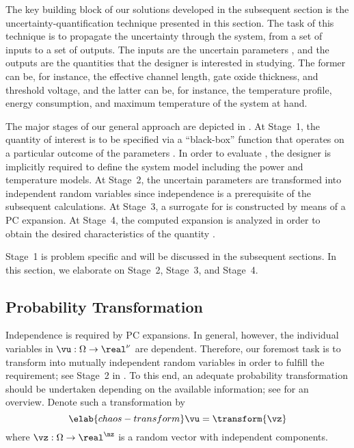 The key building block of our solutions developed in the subsequent section is
the uncertainty-quantification technique presented in this section. The task of
this technique is to propagate the uncertainty through the system, from a set of
inputs to a set of outputs. The inputs are the uncertain parameters \vu, and the
outputs are the quantities that the designer is interested in studying. The
former can be, for instance, the effective channel length, gate oxide thickness,
and threshold voltage, and the latter can be, for instance, the temperature
profile, energy consumption, and maximum temperature of the system at hand.

The major stages of our general approach are depicted in .
At Stage~1, the quantity of interest \g is to be specified via a ``black-box''
function that operates on a particular outcome of the parameters \vu. In order
to evaluate \g, the designer is implicitly required to define the system model
including the power and temperature models. At Stage~2, the uncertain parameters
\vu are transformed into independent random variables \vz since independence is
a prerequisite of the subsequent calculations. At Stage~3, a surrogate for \g is
constructed by means of a \ac{PC} expansion. At Stage~4, the computed expansion
is analyzed in order to obtain the desired characteristics of the quantity \g.

Stage~1 is problem specific and will be discussed in the subsequent sections. In
this section, we elaborate on Stage~2, Stage~3, and Stage~4.

\subsection{Probability Transformation}

Independence is required by \ac{PC} expansions. In general, however, the \nu
individual variables in $\vu: \Omega \to \real^\nu$ are dependent. Therefore,
our foremost task is to transform \vu into mutually independent random variables
in order to fulfill the requirement; see Stage~2 in . To
this end, an adequate probability transformation should be undertaken depending
on the available information; see \cite{eldred2008} for an overview. Denote such
a transformation by
\begin{equation} \elab{chaos-transform}
  \vu = \transform{\vz}
\end{equation}
where $\vz: \Omega \to \real^\nz$ is a random vector with \nz independent
components.

